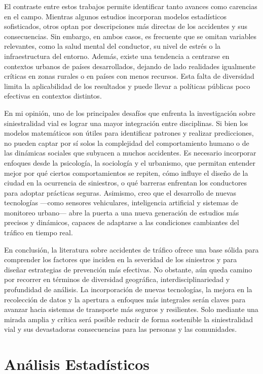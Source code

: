 \documentclass{book}
\begin{document}
El contraste entre estos trabajos permite identificar tanto avances como carencias en el campo. Mientras algunos estudios incorporan modelos estadísticos sofisticados, otros optan por descripciones más directas de los accidentes y sus consecuencias. Sin embargo, en ambos casos, es frecuente que se omitan variables relevantes, como la salud mental del conductor, su nivel de estrés o la infraestructura del entorno. Además, existe una tendencia a centrarse en contextos urbanos de países desarrollados, dejando de lado realidades igualmente críticas en zonas rurales o en países con menos recursos. Esta falta de diversidad limita la aplicabilidad de los resultados y puede llevar a políticas públicas poco efectivas en contextos distintos.

En mi opinión, uno de los principales desafíos que enfrenta la investigación sobre siniestralidad vial es lograr una mayor integración entre disciplinas. Si bien los modelos matemáticos son útiles para identificar patrones y realizar predicciones, no pueden captar por sí solos la complejidad del comportamiento humano o de las dinámicas sociales que subyacen a muchos accidentes. Es necesario incorporar enfoques desde la psicología, la sociología y el urbanismo, que permitan entender mejor por qué ciertos comportamientos se repiten, cómo influye el diseño de la ciudad en la ocurrencia de siniestros, o qué barreras enfrentan los conductores para adoptar prácticas seguras. Asimismo, creo que el desarrollo de nuevas tecnologías ---como sensores vehiculares, inteligencia artificial y sistemas de monitoreo urbano--- abre la puerta a una nueva generación de estudios más precisos y dinámicos, capaces de adaptarse a las condiciones cambiantes del tráfico en tiempo real.

En conclusión, la literatura sobre accidentes de tráfico ofrece una base sólida para comprender los factores que inciden en la severidad de los siniestros y para diseñar estrategias de prevención más efectivas. No obstante, aún queda camino por recorrer en términos de diversidad geográfica, interdisciplinariedad y profundidad de análisis. La incorporación de nuevas tecnologías, la mejora en la recolección de datos y la apertura a enfoques más integrales serán claves para avanzar hacia sistemas de transporte más seguros y resilientes. Solo mediante una mirada amplia y crítica será posible reducir de forma sostenible la siniestralidad vial y sus devastadoras consecuencias para las personas y las comunidades.

\section{Análisis Estadísticos}
\end{document}
